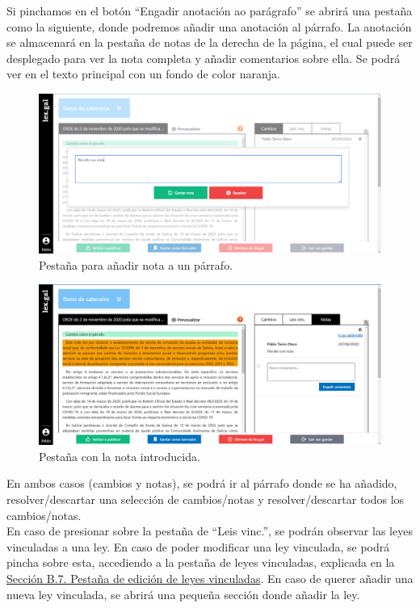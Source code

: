 Si pinchamos en el botón ``Engadir anotación ao parágrafo'' se abrirá una pestaña como la siguiente, donde podremos añadir una anotación al párrafo. La anotación se almacenará en la pestaña de notas de la derecha de la página, el cual puede ser desplegado para ver la nota completa y añadir comentarios sobre ella. Se podrá ver en el texto principal con un fondo de color naranja.

\begin{figure}[H]
\centerline{\includegraphics[width=15cm]{figuras/manualUsuario/Notas.PNG}}
\caption{Pestaña para añadir nota a un párrafo.}
\label{enlaceNotas}
\end{figure}

\begin{figure}[H]
\centerline{\includegraphics[width=15cm]{figuras/manualUsuario/PestanaNotas.PNG}}
\caption{Pestaña con la nota introducida.}
\label{enlacePestanaNotas}
\end{figure}

En ambos casos (cambios y notas), se podrá ir al párrafo donde se ha añadido, resolver/descartar una selección de cambios/notas y resolver/descartar todos los cambios/notas.
\\

En caso de presionar sobre la pestaña de ``Leis vinc.'', se podrán observar las leyes vinculadas a una ley. En caso de poder modificar una ley vinculada, se podrá pincha sobre esta, accediendo a la pestaña de leyes vinculadas, explicada en la \hyperref[PPrevisualizacionLexGal]{Sección B.7. Pestaña de edición de leyes vinculadas}. En caso de querer añadir una nueva ley vinculada, se abrirá una pequeña sección donde añadir la ley.

